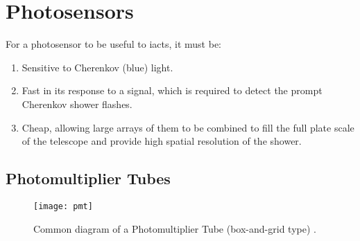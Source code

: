 \section{Photosensors}

For a photosensor to be useful to \glspl{iact}, it must be:
\begin{enumerate}
\item Sensitive to Cherenkov (blue) light.
\item Fast in its response to a signal, which is required to detect the prompt Cherenkov shower flashes.
\item Cheap, allowing large arrays of them to be combined to fill the full plate scale of the telescope and provide high spatial resolution of the shower.
\end{enumerate}

\subsection{Photomultiplier Tubes}

\begin{figure}
	\centering
    \texttt{[image: pmt]} 
	\caption[Diagram of a Photomultiplier Tube.]{Common diagram of a Photomultiplier Tube (box-and-grid type) \cite{Hamamatsu2016}.}
	\label{fig:pmt}
\end{figure}


